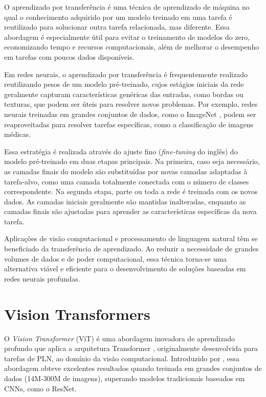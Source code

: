 O aprendizado por transferência \citep{Zhuang2021} é uma técnica de aprendizado de máquina no qual o conhecimento adquirido por um modelo treinado em uma tarefa é reutilizado para solucionar outra tarefa relacionada, mas diferente. Essa abordagem é especialmente útil para evitar o treinamento de modelos do zero, economizando tempo e recursos computacionais, além de melhorar o desempenho em tarefas com poucos dados disponíveis.

Em redes neurais, o aprendizado por transferência é frequentemente realizado reutilizando pesos de um modelo pré-treinado, cujos estágios iniciais da rede geralmente capturam características genéricas das entradas, como bordas ou texturas, que podem ser úteis para resolver novos problemas. Por exemplo, redes neurais treinadas em grandes conjuntos de dados, como o ImageNet \citep{Russakovsky2015}, podem ser reaproveitadas para resolver tarefas específicas, como a classificação de imagens médicas.

Essa estratégia é realizada através do ajuste fino (\textit{fine-tuning} do inglês) do modelo pré-treinado em duas etapas principais. Na primeira, caso seja necessário, as camadas finais do modelo são substituídas por novas camadas adaptadas à tarefa-alvo, como uma camada totalmente conectada com o número de classes correspondente. Na segunda etapa, parte ou toda a rede é treinada com os novos dados. As camadas iniciais geralmente são mantidas inalteradas, enquanto as camadas finais são ajustadas para aprender as características específicas da nova tarefa.

Aplicações de visão computacional e processamento de linguagem natural têm se beneficiado da transferência de aprendizado. Ao reduzir a necessidade de grandes volumes de dados e de poder computacional, essa técnica torna-se uma alternativa viável e eficiente para o desenvolvimento de soluções baseadas em redes neurais profundas.

\section{Vision Transformers}\label{sec:vision-transformers}

O \textit{Vision Transformer} (ViT) é uma abordagem inovadora de aprendizado profundo que aplica a arquitetura Transformer \citep{vaswani2023attentionneed}, originalmente desenvolvida para tarefas de PLN, ao domínio da visão computacional. Introduzido por \cite{Dosovitskiy2021}, essa abordagem obteve excelentes resultados quando treinada em grandes conjuntos de dados (14M-300M de imagens), superando modelos tradicionais baseados em CNNs, como o ResNet.

